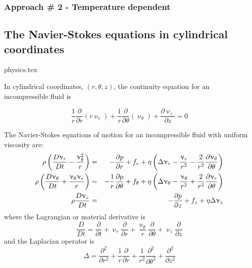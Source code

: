 \subsubsection{Approach \# 2 - Temperature dependent \label{ss:dimeqs2}}




\subsection{The Navier-Stokes equations in cylindrical coordinates}
\begin{flushright} {\tiny {\color{gray} physics.tex}} \end{flushright}

In cylindrical coordinates, $(r,\theta,z)$, the continuity equation for an incompressible fluid is 
\begin{mdframed}[backgroundcolor=blue!5]
\begin{equation}
\frac{1}{r} \frac{\partial}{\partial r} (r \upnu_r) + 
\frac{1}{r} \frac{\partial}{\partial \theta} (\upnu_\theta) + 
\frac{\partial \upnu_z}{\partial z} =0
\end{equation}
\end{mdframed}

The Navier-Stokes equations of motion for an incompressible fluid with uniform viscosity are:
\begin{eqnarray}
\rho \left(  \frac{D\upnu_r}{Dt} -\frac{\upnu_\theta^2}{r} \right) 
&=& -\frac{\partial p}{\partial r} + f_r + \eta
\left( \Delta \upnu_r - \frac{\upnu_r}{r^2} - \frac{2}{r^2} \frac{\partial \upnu_\theta}{\partial \theta}
\right)
\nonumber\\
\rho \left(  \frac{D\upnu_\theta}{Dt} +\frac{\upnu_\theta \upnu_r}{r} \right) 
&=&
-\frac{1}{r} \frac{\partial p}{\partial \theta} + f_\theta + \eta
\left(
\Delta \upnu_\theta - \frac{\upnu_\theta}{r^2} + \frac{2}{r^2} \frac{\partial \upnu_r}{\partial\theta}
\right)
\nonumber\\
\rho \frac{D\upnu_z}{Dt} 
&=& 
-\frac{\partial p}{\partial z} + f_z + \eta \Delta \upnu_z
\end{eqnarray}
where the Lagrangian or material derivative is
\[
\frac{D}{Dt} = \frac{\partial}{\partial t} 
+ \upnu_r \frac{\partial}{\partial r}  
+ \frac{\upnu_\theta}{r} \frac{\partial}{\partial \theta}
+ \upnu_z \frac{\partial}{\partial z}  
\]
and the Laplacian operator is   
\begin{equation}
\Delta 
= \frac{\partial^2 }{\partial r^2}  +\frac{1}{r} \frac{\partial }{\partial r}
+ \frac{1}{r^2}  \frac{\partial^2}{\partial \theta^2}
+ \frac{\partial^2 }{\partial z^2}
\end{equation}


